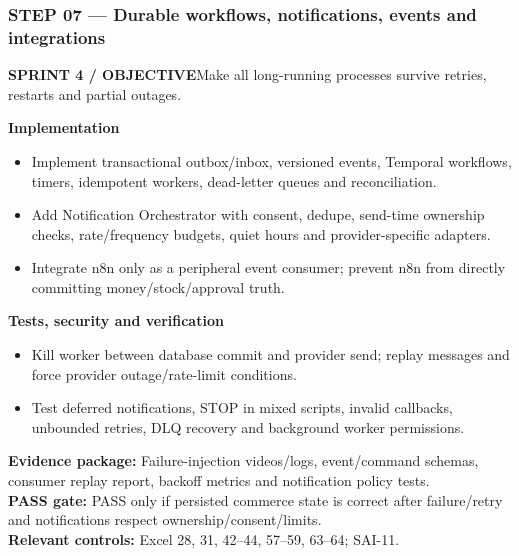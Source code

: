 \documentclass[10.5pt,a4paper,oneside]{article}
\newcommand{\eyebrow}[1]{{\sffamily\footnotesize\bfseries\color{gold}\MakeUppercase{#1}}}
\begin{document}
\subsubsection*{STEP 07 --- Durable workflows, notifications, events and integrations}
\eyebrow{Sprint 4 / objective}\quad Make all long-running processes survive retries, restarts and partial outages.
\begin{tcolorbox}[colback=warm,colframe=line,boxrule=.45pt,arc=2pt,left=8pt,right=8pt,top=6pt,bottom=6pt]\textbf{Implementation}
\begin{itemize}
\item Implement transactional outbox/inbox, versioned events, Temporal workflows, timers, idempotent workers, dead-letter queues and reconciliation.
\item Add Notification Orchestrator with consent, dedupe, send-time ownership checks, rate/frequency budgets, quiet hours and provider-specific adapters.
\item Integrate n8n only as a peripheral event consumer; prevent n8n from directly committing money/stock/approval truth.
\end{itemize}
\textbf{Tests, security and verification}
\begin{itemize}
\item Kill worker between database commit and provider send; replay messages and force provider outage/rate-limit conditions.
\item Test deferred notifications, STOP in mixed scripts, invalid callbacks, unbounded retries, DLQ recovery and background worker permissions.
\end{itemize}
\textbf{Evidence package:} Failure-injection videos/logs, event/command schemas, consumer replay report, backoff metrics and notification policy tests.\\
\textbf{PASS gate:} PASS only if persisted commerce state is correct after failure/retry and notifications respect ownership/consent/limits.\\
\textbf{Relevant controls:} Excel 28, 31, 42--44, 57--59, 63--64; SAI-11.
\end{tcolorbox}
\Needspace{100mm}
\end{document}
